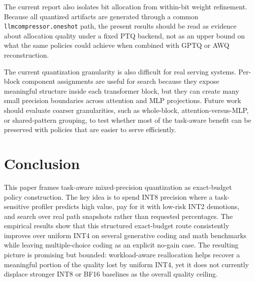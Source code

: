 \documentclass{article}
\newcommand{\inttwo}{INT2}
\newcommand{\intfour}{INT4}
\newcommand{\inteight}{INT8}
\begin{document}
The current report also isolates bit allocation from within-bit weight refinement. Because all quantized artifacts are generated through a common \texttt{llmcompressor.oneshot} path, the present results should be read as evidence about allocation quality under a fixed PTQ backend, not as an upper bound on what the same policies could achieve when combined with GPTQ or AWQ reconstruction.

The current quantization granularity is also difficult for real serving systems. Per-block component assignments are useful for search because they expose meaningful structure inside each transformer block, but they can create many small precision boundaries across attention and MLP projections. Future work should evaluate coarser granularities, such as whole-block, attention-versus-MLP, or shared-pattern grouping, to test whether most of the task-aware benefit can be preserved with policies that are easier to serve efficiently.

\section{Conclusion}

This paper frames task-aware mixed-precision quantization as exact-budget policy construction. The key idea is to spend \inteight{} precision where a task-sensitive profiler predicts high value, pay for it with low-risk \inttwo{} demotions, and search over real path snapshots rather than requested percentages. The empirical results show that this structured exact-budget route consistently improves over uniform \intfour{} on several generative coding and math benchmarks while leaving multiple-choice coding as an explicit no-gain case. The resulting picture is promising but bounded: workload-aware reallocation helps recover a meaningful portion of the quality lost by uniform \intfour{}, yet it does not currently displace stronger \inteight{} or BF16 baselines as the overall quality ceiling.
\end{document}
